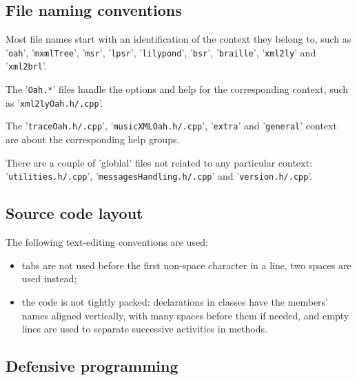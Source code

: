 \subsection{File naming conventions}

Most file names start with an identification of the context they belong to, such as '{\tt oah}', '{\tt mxmlTree}', '{\tt msr}', '{\tt lpsr}', '{\tt lilypond}', '{\tt bsr}', '{\tt braille}', '{\tt xml2ly}' and '{\tt xml2brl}'.

The '{\tt *Oah.*}' files handle the options and help for the corresponding context, such as '{\tt xml2lyOah.h/.cpp}'.

The '{\tt traceOah.h/.cpp}', '{\tt musicXMLOah.h/.cpp}', '{\tt extra}' and '{\tt general}' context are about the corresponding help groups.

There are a couple of 'globlal' files not related to any particular context: '{\tt utilities.h/.cpp}', '{\tt messagesHandling.h/.cpp}' and '{\tt version.h/.cpp}'.


\subsection{Source code layout}

The following text-editing conventions are used:
\begin{itemize}
\item tabs are not used before the first non-space character in a line, two spaces are used instead;

\item the code is not tightly packed: declarations in classes have the members' names aligned vertically, with many spaces before them if needed, and empty lines are used to separate successive activities in methods.
\end{itemize}


\subsection{Defensive programming}

